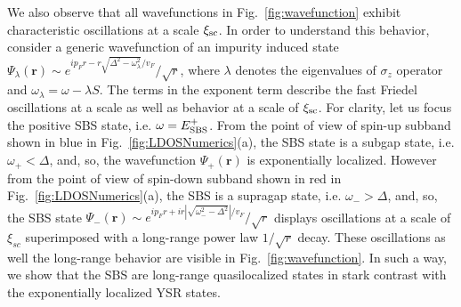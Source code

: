 \documentclass[twocolumn,showpacs,floatfix,longbibliography]{revtex4-1}
\begin{document}
We also observe that all wavefunctions in Fig.~\ref{fig:wavefunction} exhibit characteristic oscillations at a scale $\xi_{\rm sc}$. In order to understand this behavior, consider a generic wavefunction of an impurity induced state ${\Psi_\lambda(\bm r) \sim e^{ip_Fr-r\sqrt{\Delta^2-\omega^2_\lambda}/v_F}/\sqrt{r}}$, where $\lambda$ denotes the eigenvalues of $\sigma_z$ operator and $\omega_\lambda = \omega - \lambda S$. The terms in the exponent term describe the fast Friedel oscillations at a scale as well as behavior at a scale of $\xi_{\rm sc}$. For clarity, let us focus the positive SBS state, i.e. $\omega = E^{+}_{\rm SBS}$. From the point of view of spin-up subband shown in blue in Fig.~\ref{fig:LDOSNumerics}(a), the SBS state is a subgap state, i.e. $\omega_+<\Delta$, and, so, the wavefunction $\Psi_+(\bm r)$ is exponentially localized. However from the point of view of spin-down subband shown in red in Fig.~\ref{fig:LDOSNumerics}(a), the SBS is a supragap state, i.e. $\omega_->\Delta$, and, so, the SBS state  $\Psi_-(\bm r)  \sim e^{ip_Fr+ir\left|\sqrt{\omega^2_--\Delta^2}\right|/v_F}/\sqrt{r}$ displays oscillations  at a scale of $\xi_{sc}$ superimposed with a long-range power law $1/\sqrt{r}$ decay. These oscillations as well the long-range behavior are visible in Fig.~\ref{fig:wavefunction}. In such a way, we show that the SBS are long-range quasilocalized states in stark contrast with the exponentially localized YSR states.
\end{document}
